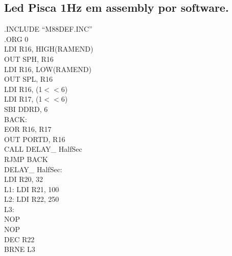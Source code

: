 \documentclass[titlepage, a4paper, 10pt, reqno, openany]{report}
\begin{document}
	\subsection{Led Pisca 1Hz em assembly por software.}
\begin{minipage}[T]{.3\linewidth}
.INCLUDE \textquotedblleft M88DEF.INC\textquotedblright \\
.ORG 0 \\
\hspace*{.5cm}	LDI R16, HIGH(RAMEND) \\
\hspace*{.5cm}	OUT SPH, R16 \\
\hspace*{.5cm}	LDI R16, LOW(RAMEND) \\
\hspace*{.5cm}	OUT SPL, R16 \\
\hspace*{.5cm}	LDI R16, (1$<<$6) \\
\hspace*{.5cm}	LDI R17, (1$<<$6) \\
\hspace*{.5cm}	SBI DDRD, 6 \\
BACK: \\
\hspace*{.5cm}	EOR R16, R17 \\
\hspace*{.5cm}	OUT PORTD, R16 \\
\hspace*{.5cm}	CALL DELAY\_ HalfSec \\
\hspace*{.5cm}	RJMP BACK \\
DELAY\_ HalfSec: \\
\hspace*{.5cm}	LDI R20, 32 \\
L1:	\hspace{.5cm} LDI R21, 100 \\
L2:	\hspace{.5cm} LDI R22, 250 \\
L3: \hspace{.5cm} \\
\hspace*{.5cm}	NOP \\
\hspace*{.5cm}	NOP \\
\hspace*{.5cm}	DEC R22 \\
\hspace*{.5cm}	BRNE L3 \\

\end{minipage}
\end{document}
